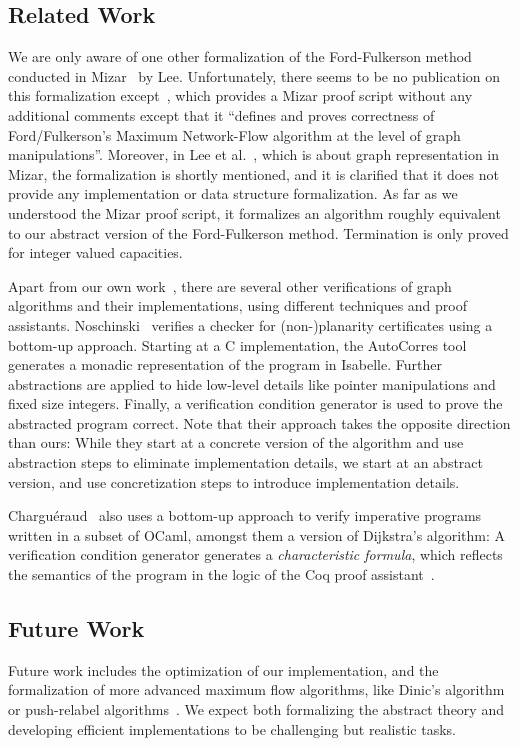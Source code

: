 \documentclass{llncs}
\begin{document}
  
  \subsection{Related Work}\label{sec:related_work}
  We are only aware of one other formalization of the Ford-Fulkerson method conducted in Mizar~\cite{MaRu05} by Lee. Unfortunately, there seems to be no publication
  on this formalization except~\cite{Lee05}, which provides a Mizar proof script without any additional comments except that it ``defines and proves correctness of Ford/Fulkerson's Maximum Network-Flow algorithm at the level of graph manipulations''. Moreover, in Lee et al.~\cite{LeRu07}, which is about graph representation in Mizar, the formalization is shortly mentioned, and it is clarified that it does not provide any implementation or data structure formalization.
  As far as we understood the Mizar proof script, it formalizes an algorithm roughly equivalent to our abstract version of the Ford-Fulkerson method.
  Termination is only proved for integer valued capacities.
  
  Apart from our own work~\cite{La14,NoLa12}, there are several other verifications of graph algorithms and their implementations, using different techniques and proof assistants. Noschinski~\cite{Nosch15} verifies a checker for (non-)planarity certificates using a bottom-up approach. Starting at a C implementation,
  the AutoCorres tool~\cite{Greenaway15,GAK12} generates a monadic representation of the program in Isabelle. Further abstractions are applied
  to hide low-level details like pointer manipulations and fixed size integers. Finally, a verification condition
  generator is used to prove the abstracted program correct. Note that their approach takes the opposite direction than ours: While they start at a concrete version of the algorithm and use abstraction steps to eliminate implementation details, we start at an abstract version, and use concretization steps to introduce implementation details.

  Chargu\'eraud~\cite{char11} also uses a bottom-up approach to verify imperative programs written in a subset of OCaml, amongst them a version of Dijkstra's algorithm:
  A verification condition generator generates a \emph{characteristic formula}, which reflects the semantics of the program in the logic of the Coq proof assistant~\cite{BeCa10}.
  
  \subsection{Future Work}
  Future work includes the optimization of our implementation, and the formalization of more advanced maximum flow algorithms, like Dinic's algorithm~\cite{Di06} or push-relabel algorithms~\cite{GoTa88}.
  We expect both formalizing the abstract theory and developing efficient implementations to be challenging but realistic tasks.
  
\end{document}
